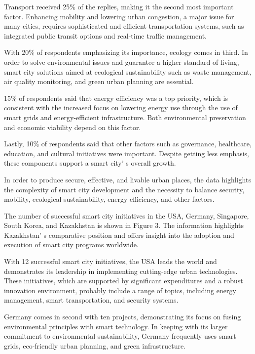 \begin{multicols}{2}
Transport received 25\% of the replies, making it the second most
important factor. Enhancing mobility and lowering urban congestion, a
major issue for many cities, requires sophisticated and efficient
transportation systems, such as integrated public transit options and
real-time traffic management.

With 20\% of respondents emphasizing its importance, ecology comes in
third. In order to solve environmental issues and guarantee a higher
standard of living, smart city solutions aimed at ecological
sustainability such as waste management, air quality monitoring, and
green urban planning are essential.

15\% of respondents said that energy efficiency was a top priority,
which is consistent with the increased focus on lowering energy use
through the use of smart grids and energy-efficient infrastructure. Both
environmental preservation and economic viability depend on this factor.

Lastly, 10\% of respondents said that other factors such as governance,
healthcare, education, and cultural initiatives were important. Despite
getting less emphasis, these components support a smart
city' s overall growth.

In order to produce secure, effective, and livable urban places, the
data highlights the complexity of smart city development and the
necessity to balance security, mobility, ecological sustainability,
energy efficiency, and other factors.

The number of successful smart city initiatives in the USA, Germany,
Singapore, South Korea, and Kazakhstan is shown in Figure 3. The
information highlights Kazakhstan' s comparative position
and offers insight into the adoption and execution of smart city
programs worldwide.

With 12 successful smart city initiatives, the USA leads the world and
demonstrates its leadership in implementing cutting-edge urban
technologies. These initiatives, which are supported by significant
expenditures and a robust innovation environment, probably include a
range of topics, including energy management, smart transportation, and
security systems.

Germany comes in second with ten projects, demonstrating its focus on
fusing environmental principles with smart technology. In keeping with
its larger commitment to environmental sustainability, Germany
frequently uses smart grids, eco-friendly urban planning, and green
infrastructure.
\end{multicols}

